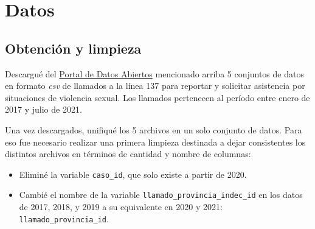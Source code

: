 \documentclass[10 pt]{article}
\begin{document}
\section{Datos}\label{datos}

\subsection{Obtención y limpieza}\label{limpieza}
Descargué del \href{http://datos.jus.gob.ar/}{Portal de Datos Abiertos} mencionado arriba 5 conjuntos de datos en formato \textit{csv} de llamados a la línea 137 para reportar y solicitar asistencia por situaciones de violencia sexual. Los llamados pertenecen al período entre enero de 2017 y julio de 2021. 

Una vez descargados, unifiqué los 5 archivos en un solo conjunto de datos. Para eso fue necesario realizar una primera limpieza destinada a dejar consistentes los distintos archivos en términos de cantidad y nombre de columnas:

\begin{itemize}
    \item Eliminé la variable \texttt{caso\_id}, que solo existe a partir de 2020.
    \item Cambié el nombre de la variable \texttt{llamado\_provincia\_indec\_id} en los datos de 2017, 2018, y 2019 a su equivalente en 2020 y 2021: \texttt{llamado\_provincia\_id}.
\end{itemize}
\end{document}
